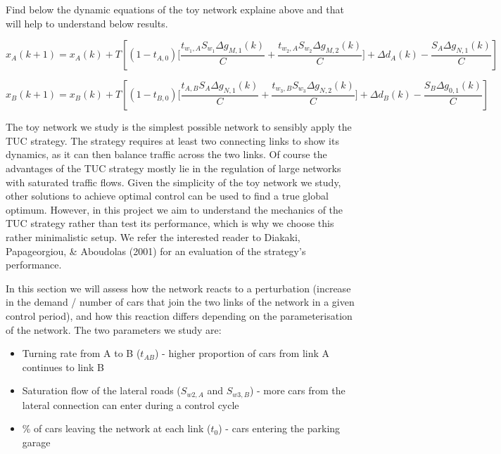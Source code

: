 \documentclass[11pt]{article}
\begin{document}
Find below the dynamic equations of the toy network explaine above and that will help to understand below results.

\begin{equation}
x_{A}(k+1)=x_{A}(k)+T\left[\left(1-t_{A,0}\right)\bigg[\frac{t_{w_{1},A}S_{w_{1}}\Delta g_{M,1}(k)}{C}+\frac{t_{w_{2},A}S_{w_{2}}\Delta g_{M,2}(k)}{C}\bigg]+\Delta d_{A}(k)-\frac{S_{A}\Delta g_{N,1}(k)}{C}\right]
\end{equation}

\begin{equation}
x_{B}(k+1)=x_{B}(k)+T\left[\left(1-t_{B,0}\right)\bigg[\frac{t_{A,B}S_{A}\Delta g_{N,1}(k)}{C}+\frac{t_{w_{3},B}S_{w_{3}}\Delta g_{N,2}(k)}{C}\bigg]+\Delta d_{B}(k)-\frac{S_{B}\Delta g_{0,1}(k)}{C}\right]
\end{equation}


The toy network we study is the simplest possible network to sensibly apply the TUC strategy. The strategy requires at least two connecting links to show its dynamics, as it can then balance traffic across the two links. Of course the advantages of the TUC strategy mostly lie in the regulation of large networks with saturated traffic flows. Given the simplicity of the toy network we study, other solutions to achieve optimal control can be used to find a true global optimum. However, in this project we aim to understand the mechanics of the TUC strategy rather than test its performance, which is why we choose this rather minimalistic setup. We refer the interested reader to Diakaki, Papageorgiou, \& Aboudolas (2001) for an evaluation of the strategy's performance.

In this section we will assess how the network reacts to a perturbation (increase in the demand / number of cars that join the two links of the network in a given control period), and how this reaction differs depending on the parameterisation of the network. The two parameters we study are:

\begin{itemize}
\item Turning rate from A to B ($t_{AB}$) - higher proportion of cars from link A continues to link B
\item Saturation flow of the lateral roads ($S_{w2,A}$ and $S_{w3,B}$) - more cars from the lateral connection can enter during a control cycle
\item \% of cars leaving the network at each link ($t_0$) - cars entering the parking garage
\end{itemize}
\end{document}
